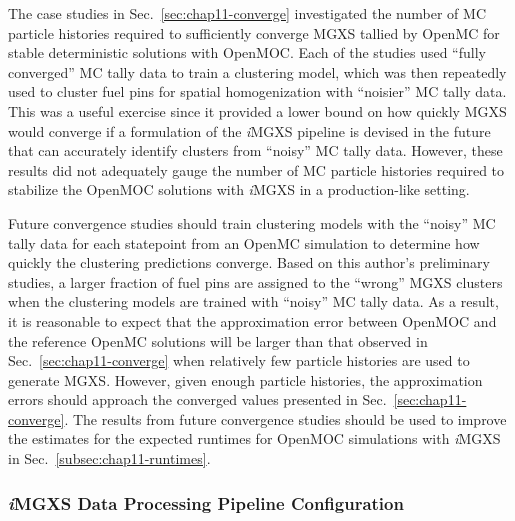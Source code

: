 The case studies in Sec.~\ref{sec:chap11-converge} investigated the number of \ac{MC} particle histories required to sufficiently converge \ac{MGXS} tallied by OpenMC for stable deterministic solutions with OpenMOC. Each of the studies used ``fully converged'' \ac{MC} tally data to train a clustering model, which was then repeatedly used to cluster fuel pins for spatial homogenization with ``noisier'' \ac{MC} tally data. This was a useful exercise since it provided a lower bound on how quickly \ac{MGXS} would converge if a formulation of the \textit{i}\ac{MGXS} pipeline is devised in the future that can accurately identify clusters from ``noisy'' \ac{MC} tally data. However, these results did not adequately gauge the number of \ac{MC} particle histories required to stabilize the OpenMOC solutions with \textit{i}\ac{MGXS} in a production-like setting.

Future convergence studies should train clustering models with the ``noisy'' MC tally data for each statepoint from an OpenMC simulation to determine how quickly the clustering predictions converge. Based on this author's preliminary studies, a larger fraction of fuel pins are assigned to the ``wrong'' \ac{MGXS} clusters when the clustering models are trained with ``noisy'' \ac{MC} tally data. As a result, it is reasonable to expect that the approximation error between OpenMOC and the reference OpenMC solutions will be larger than that observed in Sec.~\ref{sec:chap11-converge} when relatively few particle histories are used to generate \ac{MGXS}. However, given enough particle histories, the approximation errors should approach the converged values presented in Sec.~\ref{sec:chap11-converge}. The results from future convergence studies should be used to improve the estimates for the expected runtimes for OpenMOC simulations with \textit{i}\ac{MGXS} in Sec.~\ref{subsec:chap11-runtimes}.


\subsubsection{\textit{i}MGXS Data Processing Pipeline Configuration}
\label{subsubsec:chap12-optimize-imgxs}

